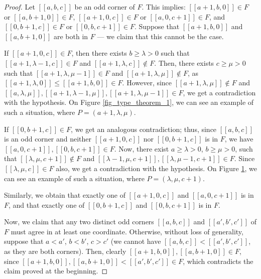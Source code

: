 \documentclass[10pt,a4paper]{amsart}
\begin{document}
\begin{proof}
    Let $[[a,b,c]]$ be an odd corner of $F$. This implies: $[[a+1,b,0]] \in F$ or $[[a,b+1,0]] \in F$, $[[a+1,0,c]] \in F$ or $[[a,0,c+1]] \in F$, and $[[0,b+1,c]] \in F$ or $[[0,b,c+1]] \in F$. Suppose that $[[a+1,b,0]]$ and $[[a,b+1,0]]$ are both in $F$ --- we claim that this cannot be the case. 

    If $[[a+1,0,c]] \in F$, then there exists $b \geq \lambda > 0$ such that $[[a+1,\lambda-1,c]] \in F$ and $[[a+1,\lambda,c]] \notin F$. Then, there exists $c \geq \mu > 0$ such that $[[a+1,\lambda,\mu-1]] \in F$ and $[[a+1,\lambda,\mu]] \notin F$, as $[[a+1,\lambda,0]] \leq [[a+1,b,0]] \in F$. However, since $[[a+1,\lambda,\mu]] \notin F$ and $[[a,\lambda,\mu]], [[a+1,\lambda-1,\mu]], [[a+1,\lambda,\mu-1]] \in F$, we get a contradiction with the hypothesis. On Figure \ref{fig_type_theorem_1}, we can see an example of such a situation, where $P = (a+1,\lambda,\mu)$. 
    
    If $[[0,b+1,c]] \in F$, we get an analogous contradiction; thus, since $[[a,b,c]]$ is an odd corner and neither $[[a+1,0,c]]$ nor $[[0,b+1,c]]$ is in $F$, we have $[[a,0,c+1]], [[0,b,c+1]] \in F$. Now, there exist $a \geq \lambda > 0$, $b \geq \mu > 0$, such that $[[\lambda,\mu,c+1]] \notin F$ and $[[\lambda-1,\mu,c+1]], [[\lambda,\mu-1,c+1]] \in F$. Since $[[\lambda,\mu,c]] \in F$ also, we get a contradiction with the hypothesis. On Figure \ref{fig_type_theorem_2}, we can see an example of such a situation, where $P = (\lambda,\mu,c+1)$.


\begin{figure}[h]
    \centering
    \begin{minipage}[t]{0.48\textwidth}
        \centering
        
        \caption{}
        \label{fig_type_theorem_1}
    \end{minipage}
    \begin{minipage}[t]{0.48\textwidth}
        \centering
        
        \caption{}
        \label{fig_type_theorem_2}
    \end{minipage}
\end{figure}

    Similarly, we obtain that exactly one of $[[a+1,0,c]]$ and $[[a,0,c+1]]$ is in $F$, and that exactly one of $[[0,b+1,c]]$ and $[[0,b,c+1]]$ is in $F$. 

    Now, we claim that any two distinct odd corners $[[a,b,c]]$ and $[[a',b',c']]$ of $F$ must agree in at least one coordinate. Otherwise, without loss of generality, suppose that $a < a'$, $b < b'$, $c > c'$ (we cannot have $[[a,b,c]] < [[a',b',c']]$, as they are both corners). Then, clearly $[[a+1,b,0]], [[a,b+1,0]] \in F$, since $[[a+1,b,0]], [[a,b+1,0]] < [[a',b',c']] \in F$, which contradicts the claim proved at the beginning.


\end{proof}
\end{document}
